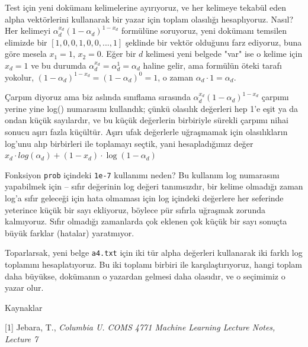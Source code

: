\documentclass[12pt,fleqn]{article}\usepackage{../../common}
\begin{document}
Test için yeni dokümanı kelimelerine ayırıyoruz, ve her kelimeye tekabül eden
alpha vektörlerini kullanarak bir yazar için toplam olasılığı
hesaplıyoruz. Nasıl? Her kelimeyi $\alpha_d^{x_d}(1-\alpha_d)^{1-x_d}$ formülüne
soruyoruz, yeni dokümanı temsilen elimizde bir $[1,0,0,1,0,0,...,1]$ şeklinde
bir vektör olduğunu farz ediyoruz, buna göre mesela $x_1=1$, $x_2=0$. Eğer bir
$d$ kelimesi yeni belgede "var" ise o kelime için $x_d = 1$ ve bu durumda
$\alpha_d^{x_d} = \alpha_d^{1} = \alpha_d$ haline gelir, ama formülün öteki
tarafı yokolur, $(1-\alpha_d)^{1-x_d} = (1-\alpha_d)^0 = 1$, o zaman $\alpha_d
\cdot 1 = \alpha_d$.

Çarpım diyoruz ama biz aslında sınıflama sırasında
$\alpha_d^{x_d}(1-\alpha_d)^{1-x_d}$ çarpımı yerine yine log() numarasını
kullandık; çünkü olasılık değerleri hep 1'e eşit ya da ondan küçük sayılardır,
ve bu küçük değerlerin birbiriyle sürekli çarpımı nihai sonucu aşırı fazla
küçültür. Aşırı ufak değerlerle uğraşmamak için olasılıkların log'unu alıp
birbirleri ile toplamayı seçtik, yani hesapladığımız değer $x_d \cdot
log(\alpha_d) + (1-x_d) \cdot \log(1-\alpha_d)$

Fonksiyon \verb!prob! içindeki \verb!1e-7! kullanımı neden? Bu
kullanım log numarasını yapabilmek için -- sıfır değerinin log değeri
tanımsızdır, bir kelime olmadığı zaman log'a sıfır geleceği için hata
olmaması için log içindeki değerlere her seferinde yeterince küçük bir
sayı ekliyoruz, böylece pür sıfırla uğraşmak zorunda kalmıyoruz. Sıfır
olmadığı zamanlarda çok eklenen çok küçük bir sayı sonuçta büyük
farklar (hatalar) yaratmıyor.

Toparlarsak, yeni belge \verb!a4.txt! için iki tür alpha
değerleri kullanarak iki farklı log toplamını hesaplatıyoruz. Bu iki
toplamı birbiri ile karşılaştırıyoruz, hangi toplam daha büyükse,
dokümanın o yazardan gelmesi daha olasıdır, ve o seçimimiz o yazar
olur.

Kaynaklar

[1] Jebara, T., {\em Columbia U. COMS 4771 Machine Learning Lecture Notes, Lecture 7}
\end{document}

